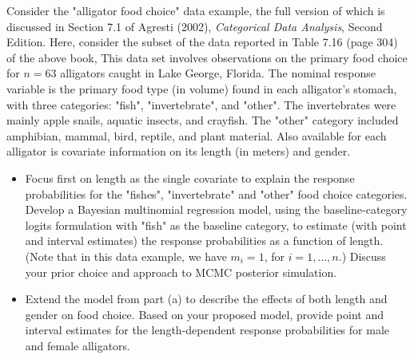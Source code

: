 \documentclass[]{article}
\begin{document}
\begin{enumerate}
{		\item[Ex 2] Consider the "alligator food choice" data example, the full version of which is discussed in Section 7.1 of Agresti (2002), \textit{Categorical Data Analysis}, Second Edition. Here, consider the subset of the data reported in Table 7.16 (page 304) of the above book, This data set involves observations on the primary food choice for $n=63$ alligators caught in Lake George, Florida. The nominal response variable is the primary food type (in volume) found in each alligator's stomach, with three categories: "fish", "invertebrate", and "other". The invertebrates were mainly apple snails, aquatic insects, and crayfish. The "other" category included amphibian, mammal, bird, reptile, and plant material. Also available for each alligator is covariate information on its length (in meters) and gender.
		\begin{itemize}
			\item[(a)] Focus first on length as the single covariate to explain the response probabilities for the "fishes", "invertebrate" and "other" food choice categories. Develop a Bayesian multinomial regression model, using the baseline-category logits formulation with "fish" as the baseline category, to estimate (with point and interval estimates) the response probabilities as a function of length. (Note that in this data example, we have $m_i = 1$, for $i = 1,\ldots,n$.) Discuss your prior choice and approach to MCMC posterior simulation.
			\item[(b)] Extend the model from part (a) to describe the effects of both length and gender on food choice. Based on your proposed model, provide point and interval estimates for the length-dependent response probabilities for male and female alligators.
		\end{itemize}
		
}
\end{enumerate}
\end{document}
